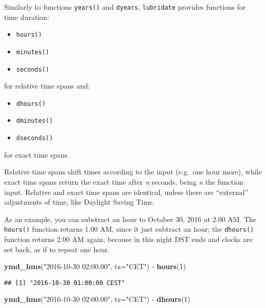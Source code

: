 \documentclass[]{book}
\newenvironment{Shaded}{\begin{snugshade}}{\end{snugshade}}
\newcommand{\KeywordTok}[1]{\textcolor[rgb]{0.13,0.29,0.53}{\textbf{{#1}}}}
\newcommand{\DataTypeTok}[1]{\textcolor[rgb]{0.13,0.29,0.53}{{#1}}}
\newcommand{\DecValTok}[1]{\textcolor[rgb]{0.00,0.00,0.81}{{#1}}}
\newcommand{\StringTok}[1]{\textcolor[rgb]{0.31,0.60,0.02}{{#1}}}
\newcommand{\NormalTok}[1]{{#1}}
\providecommand{\tightlist}{%
  \setlength{\itemsep}{0pt}\setlength{\parskip}{0pt}}
\def\tightlist{}
\begin{document}
Similarly to functions \texttt{years()} and \texttt{dyears},
\texttt{lubridate} provides functions for time duration:

\begin{itemize}
\tightlist
\item
  \texttt{hours()}
\item
  \texttt{minutes()}
\item
  \texttt{seconds()}
\end{itemize}

for relative time spans and:

\begin{itemize}
\tightlist
\item
  \texttt{dhours()}
\item
  \texttt{dminutes()}
\item
  \texttt{dseconds()}
\end{itemize}

for exact time spans.

Relative time spans shift times according to the input (e.g.~one hour
more), while exact time spans return the exact time after \emph{n}
seconds, being \emph{n} the function input. Relative and exact time
spans are identical, unless there are ``external'' adjustments of time,
like Daylight Saving Time.

As an example, you can substract an hour to October 30, 2016 at 2.00 AM.
The \texttt{hours()} function returns 1.00 AM, since it just subtract an
hour; the \texttt{dhours()} function returns 2.00 AM again, because in
this night DST ends and clocks are set back, as if to repeat one hour.

\begin{Shaded}
\begin{Highlighting}[]
\KeywordTok{ymd_hms}\NormalTok{(}\StringTok{"2016-10-30 02:00:00"}\NormalTok{, }\DataTypeTok{tz=}\StringTok{"CET"}\NormalTok{) -}\StringTok{ }\KeywordTok{hours}\NormalTok{(}\DecValTok{1}\NormalTok{)}
\end{Highlighting}
\end{Shaded}

\begin{verbatim}
## [1] "2016-10-30 01:00:00 CEST"
\end{verbatim}

\begin{Shaded}
\begin{Highlighting}[]
\KeywordTok{ymd_hms}\NormalTok{(}\StringTok{"2016-10-30 02:00:00"}\NormalTok{, }\DataTypeTok{tz=}\StringTok{"CET"}\NormalTok{) -}\StringTok{ }\KeywordTok{dhours}\NormalTok{(}\DecValTok{1}\NormalTok{)}
\end{Highlighting}
\end{Shaded}
\end{document}
